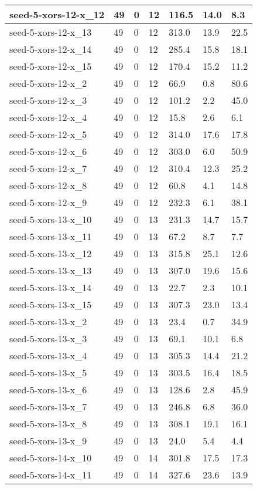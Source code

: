 \begin{scriptsize}
\begin{longtable}{|p{5cm}|l|l|l|l|l|l|}
seed-5-xors-12-x\_12&49&0&12&116.5&14.0&8.3 \\ \hline 
seed-5-xors-12-x\_13&49&0&12&313.0&13.9&22.5 \\ \hline 
seed-5-xors-12-x\_14&49&0&12&285.4&15.8&18.1 \\ \hline 
seed-5-xors-12-x\_15&49&0&12&170.4&15.2&11.2 \\ \hline 
seed-5-xors-12-x\_2&49&0&12&66.9&0.8&80.6 \\ \hline 
seed-5-xors-12-x\_3&49&0&12&101.2&2.2&45.0 \\ \hline 
seed-5-xors-12-x\_4&49&0&12&15.8&2.6&6.1 \\ \hline 
seed-5-xors-12-x\_5&49&0&12&314.0&17.6&17.8 \\ \hline 
seed-5-xors-12-x\_6&49&0&12&303.0&6.0&50.9 \\ \hline 
seed-5-xors-12-x\_7&49&0&12&310.4&12.3&25.2 \\ \hline 
seed-5-xors-12-x\_8&49&0&12&60.8&4.1&14.8 \\ \hline 
seed-5-xors-12-x\_9&49&0&12&232.3&6.1&38.1 \\ \hline 
seed-5-xors-13-x\_10&49&0&13&231.3&14.7&15.7 \\ \hline 
seed-5-xors-13-x\_11&49&0&13&67.2&8.7&7.7 \\ \hline 
seed-5-xors-13-x\_12&49&0&13&315.8&25.1&12.6 \\ \hline 
seed-5-xors-13-x\_13&49&0&13&307.0&19.6&15.6 \\ \hline 
seed-5-xors-13-x\_14&49&0&13&22.7&2.3&10.1 \\ \hline 
seed-5-xors-13-x\_15&49&0&13&307.3&23.0&13.4 \\ \hline 
seed-5-xors-13-x\_2&49&0&13&23.4&0.7&34.9 \\ \hline 
seed-5-xors-13-x\_3&49&0&13&69.1&10.1&6.8 \\ \hline 
seed-5-xors-13-x\_4&49&0&13&305.3&14.4&21.2 \\ \hline 
seed-5-xors-13-x\_5&49&0&13&303.5&16.4&18.5 \\ \hline 
seed-5-xors-13-x\_6&49&0&13&128.6&2.8&45.9 \\ \hline 
seed-5-xors-13-x\_7&49&0&13&246.8&6.8&36.0 \\ \hline 
seed-5-xors-13-x\_8&49&0&13&308.1&19.1&16.1 \\ \hline 
seed-5-xors-13-x\_9&49&0&13&24.0&5.4&4.4 \\ \hline 
seed-5-xors-14-x\_10&49&0&14&301.8&17.5&17.3 \\ \hline 
seed-5-xors-14-x\_11&49&0&14&327.6&23.6&13.9 \\ \hline 

\end{longtable}
\end{scriptsize}
